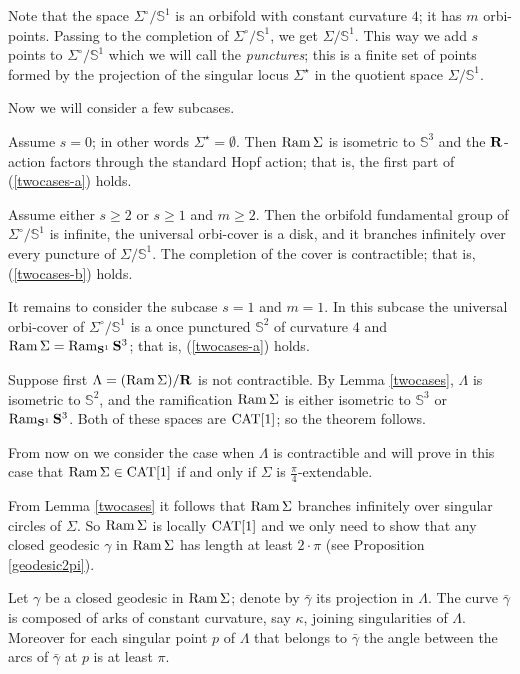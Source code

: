 \documentclass{compositio}
\begin{document}
Note that the space $\Sigma^\circ/\mathbb{S}^1$ is an orbifold with constant curvature $4$;
it has $m$ orbi-points.
Passing to the completion of $\Sigma^\circ/\mathbb{S}^1$, we get $\Sigma/\mathbb{S}^1$.
This way we add $s$ points to $\Sigma^\circ/\mathbb{S}^1$
which we will call the \emph{punctures};
this is a finite set of points formed by the projection of the singular locus $\Sigma^{{\star}}$
in the quotient space $\Sigma/\mathbb{S}^1$.

Now we will consider a few subcases.

Assume $s=0$; in other words $\Sigma^{{\star}}=\emptyset$.
Then $\mathop{\rm Ram}\nolimits\Sigma$ is isometric to $\mathbb{S}^3$
and the $\mathbf{R}$-action factors through the standard Hopf action;
that is, the first part of (\ref{twocases-a}) holds.

Assume either $s\ge 2$ or $s\ge 1$ and $m\ge 2$.
Then the orbifold fundamental group of $\Sigma^\circ/\mathbb{S}^1$ is infinite, the universal orbi-cover is a disk, and it branches
infinitely over every puncture of $\Sigma/\mathbb{S}^1$.
The completion of the cover is contractible; 
that is, (\ref{twocases-b}) holds.

It remains to consider the subcase $s=1$ and $m=1$.
In this subcase the universal orbi-cover of $\Sigma^\circ/\mathbb{S}^1$ is a once
punctured $\mathbb{S}^2$ of curvature $4$ and $\mathop{\rm Ram}\nolimits \Sigma=\mathop{\rm Ram}\nolimits_{\mathbf{S}^1}\mathbf{S}^3$; 
that is, (\ref{twocases-a}) holds.
\qeds


Suppose first $\Lambda=(\mathop{\rm Ram}\nolimits \Sigma)/\mathbf{R}$ is not contractible.
By Lemma \ref{twocases}, $\Lambda$ is isometric to $\mathbb{S}^2$,
and the ramification $\mathop{\rm Ram}\nolimits\Sigma$ is either
isometric to $\mathbb{S}^3$ or $\mathop{\rm Ram}\nolimits_{\mathbf{S}^1}\mathbf{S}^3$.
Both of these spaces are $\mathrm{CAT}[1]$;
so the theorem follows.

From now on we consider the case when $\Lambda$ is contractible and will
prove in this case that $\mathop{\rm Ram}\nolimits\Sigma\in \mathrm{CAT}[1]$
if and only if $\Sigma$ is $\frac{\pi}{4}$-extendable.

From Lemma \ref{twocases} it follows that $\mathop{\rm Ram}\nolimits \Sigma$ branches infinitely
over singular circles of $\Sigma$.
So  $\mathop{\rm Ram}\nolimits \Sigma$ is locally $\mathrm{CAT}[1]$ and we only need to show that
any closed geodesic $\gamma$ in $\mathop{\rm Ram}\nolimits \Sigma$
has length at least $2{\cdot}\pi$
(see Proposition \ref{geodesic2pi}).

Let $\gamma$ be a closed geodesic in $\mathop{\rm Ram}\nolimits \Sigma$;
denote by $\bar\gamma$ its projection in $\Lambda$.
The curve $\bar\gamma$ is composed
of arks of constant curvature, say $\kappa$, joining  singularities of $\Lambda$.
Moreover for each singular point $p$ of $\Lambda$ that belongs to $\bar\gamma$ the angle
between the arcs of $\bar\gamma$ at $p$ is at least $\pi$.
\end{document}
